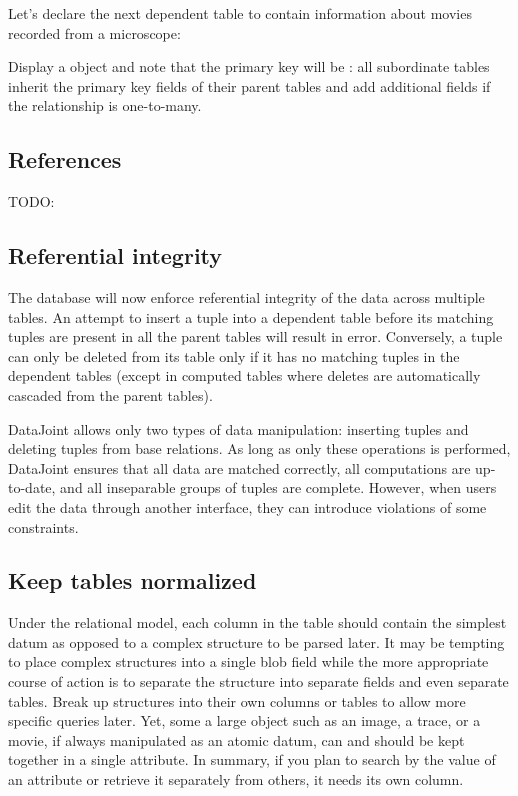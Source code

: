 \documentclass[10pt]{article}
\begin{document}
Let's declare the next dependent table  to contain information about movies recorded from a microscope:

Display a  object and note that the primary key will be : all subordinate tables inherit the primary key fields of their parent tables and add additional fields if the relationship is one-to-many.

\subsection{References}
TODO:

\subsection{Referential integrity}
The database will now enforce referential integrity of the data across multiple tables.  An attempt to insert a tuple into a dependent table before its matching tuples are present in all the parent tables will result in error.  Conversely, a tuple can only be deleted from its table only if it has no matching tuples in the dependent tables (except in computed tables where deletes are automatically cascaded from the parent tables).

DataJoint allows only two types of data manipulation: inserting tuples and deleting tuples from base relations. As long as only these operations is performed, DataJoint ensures that all data are matched correctly, all computations are up-to-date, and all inseparable groups of tuples are complete. However, when users edit the data through another interface, they can introduce violations of some constraints.



\subsection{Keep tables normalized}
Under the relational model, each column in the table should contain the simplest datum as opposed to a complex structure to be parsed later.  It may be tempting to place complex structures into a single blob field while the more appropriate course of action is to separate the structure into separate fields and even separate tables.   Break up structures into their own columns or tables to allow more specific queries later.  Yet, some a large object such as an image, a trace, or a movie, if always manipulated as an atomic datum, can and should be kept together in a single attribute.  In summary, if you plan to search by the value of an attribute or retrieve it separately from others, it needs its own column.
\end{document}
